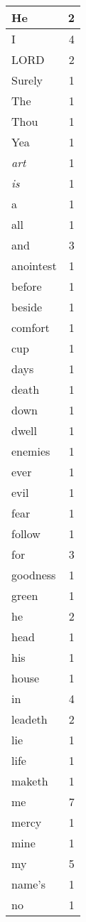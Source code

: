 \begin{center}
\begin{longtable}{l|r}
\hline \hline
\endlastfoot
He & 2 \\ \hline
I & 4 \\ \hline
LORD & 2 \\ \hline
Surely & 1 \\ \hline
The & 1 \\ \hline
Thou & 1 \\ \hline
Yea & 1 \\ \hline
\emph{art} & 1 \\ \hline
\emph{is} & 1 \\ \hline
a & 1 \\ \hline
all & 1 \\ \hline
and & 3 \\ \hline
anointest & 1 \\ \hline
before & 1 \\ \hline
beside & 1 \\ \hline
comfort & 1 \\ \hline
cup & 1 \\ \hline
days & 1 \\ \hline
death & 1 \\ \hline
down & 1 \\ \hline
dwell & 1 \\ \hline
enemies & 1 \\ \hline
ever & 1 \\ \hline
evil & 1 \\ \hline
fear & 1 \\ \hline
follow & 1 \\ \hline
for & 3 \\ \hline
goodness & 1 \\ \hline
green & 1 \\ \hline
he & 2 \\ \hline
head & 1 \\ \hline
his & 1 \\ \hline
house & 1 \\ \hline
in & 4 \\ \hline
leadeth & 2 \\ \hline
lie & 1 \\ \hline
life & 1 \\ \hline
maketh & 1 \\ \hline
me & 7 \\ \hline
mercy & 1 \\ \hline
mine & 1 \\ \hline
my & 5 \\ \hline
name's & 1 \\ \hline
no & 1 \\ \hline

\end{longtable}
\end{center}
